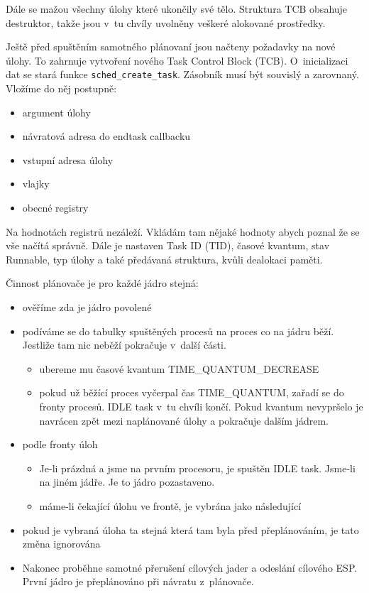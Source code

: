 \documentclass[a4paper,12pt]{article}
\begin{document}
Dále se mažou všechny úlohy které ukončily své tělo. Struktura TCB obsahuje destruktor,
takže jsou v~tu chvíly uvolněny veškeré alokované pro\-středky.

Ještě před spuštěním samotného plánovaní jsou načteny požadavky na nové úlohy. To zahrnuje
vytvoření nového Task Control Block (TCB). O~inicializaci dat se stará funkce
\verb+sched_create_task+. Zásobník musí být souvislý a zarovnaný. Vložíme do něj postupně:

\begin{itemize}
\item argument úlohy
\item návratová adresa do endtask callbacku
\item vstupní adresa úlohy
\item vlajky
\item obecné registry
\end{itemize}

Na hodnotách registrů nezáleží. Vkládám tam nějaké hodnoty abych poznal že
se vše načítá správně. Dále je nastaven Task ID (TID), časové kvantum, stav Runnable,
typ úlohy a také předávaná struktura, kvůli dealokaci paměti.

Činnost plánovače je pro každé jádro stejná:

\begin{itemize}
\item ověříme zda je jádro povolené
\item podíváme se do tabulky spuštěných procesů na proces co na jádru běží. Jestliže tam nic neběží
pokračuje v~další části.
\begin{itemize}
\item ubereme mu časové kvantum TIME\_QUANTUM\_DECREASE
\item pokud už běžící proces vyčerpal čas TIME\_QUANTUM, zařadí se do fronty procesů.
IDLE task v~tu chvíli končí. Pokud kvantum nevypršelo je navrácen zpět mezi naplánované úlohy a pokračuje
dalším jádrem.
\end{itemize}
\item podle fronty úloh
\begin{itemize}
\item Je-li prázdná a jsme na prvním procesoru, je spuštěn IDLE task. Jsme-li na jiném jádře. Je to
jádro pozastaveno.
\item máme-li čekající úlohu ve frontě, je vybrána jako následující
\end{itemize}
\item pokud je vybraná úloha ta stejná která tam byla před přeplánováním, je tato změna ignorována
\item Nakonec proběhne samotné přerušení cílových jader a odeslání cílového ESP. První jádro je
přeplánováno při návratu z~plánovače.
\end{itemize}
\end{document}
